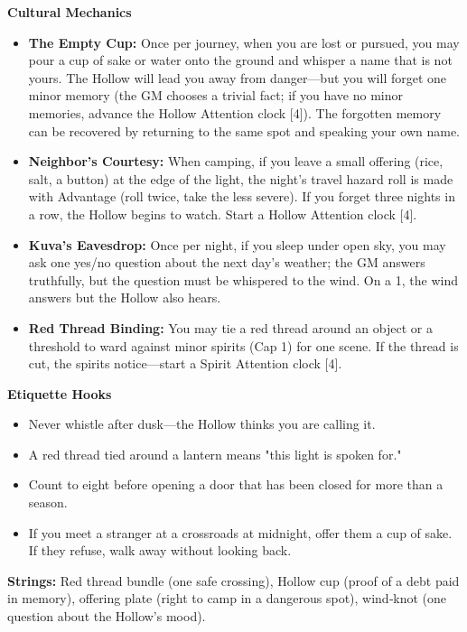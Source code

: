 \documentclass[12pt]{book}
\begin{document}
\begin{infobox}
\textbf{Cultural Mechanics}
\begin{itemize}
    \item \textbf{The Empty Cup:} Once per journey, when you are lost or pursued, you may pour a cup of sake or water onto the ground and whisper a name that is not yours. The Hollow will lead you away from danger---but you will forget one minor memory (the GM chooses a trivial fact; if you have no minor memories, advance the Hollow Attention clock [4]). The forgotten memory can be recovered by returning to the same spot and speaking your own name.
    \item \textbf{Neighbor's Courtesy:} When camping, if you leave a small offering (rice, salt, a button) at the edge of the light, the night's travel hazard roll is made with Advantage (roll twice, take the less severe). If you forget three nights in a row, the Hollow begins to watch. Start a Hollow Attention clock [4].
    \item \textbf{Kuva's Eavesdrop:} Once per night, if you sleep under open sky, you may ask one yes/no question about the next day's weather; the GM answers truthfully, but the question must be whispered to the wind. On a 1, the wind answers but the Hollow also hears.
    \item \textbf{Red Thread Binding:} You may tie a red thread around an object or a threshold to ward against minor spirits (Cap 1) for one scene. If the thread is cut, the spirits notice---start a Spirit Attention clock [4].
\end{itemize}
\textbf{Etiquette Hooks}
\begin{itemize}
    \item Never whistle after dusk---the Hollow thinks you are calling it.
    \item A red thread tied around a lantern means "this light is spoken for."
    \item Count to eight before opening a door that has been closed for more than a season.
    \item If you meet a stranger at a crossroads at midnight, offer them a cup of sake. If they refuse, walk away without looking back.
\end{itemize}
\textbf{Strings:} Red thread bundle (one safe crossing), Hollow cup (proof of a debt paid in memory), offering plate (right to camp in a dangerous spot), wind‑knot (one question about the Hollow's mood).
\end{infobox}
\end{document}
